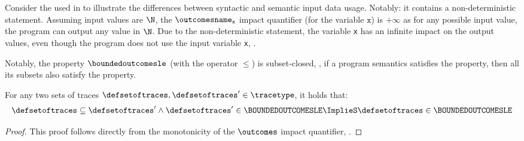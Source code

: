 \begin{example}
Consider the  used in  to illustrate the differences between syntactic and semantic input data usage. Notably: it contains a non-deterministic statement.
Assuming input values are $\N$, the $\outcomesname_{\texttt{x}}$ impact quantifier (for the variable $\texttt{x}$) is $+\infty$ as for any possible input value, the program can output any value in $\N$.
Due to the non-deterministic statement, the variable \texttt{x} has an infinite impact on the output values, even though the program does not use the input variable \texttt{x}, \cf{} .
\end{example}

Notably, the property $\boundedoutcomesle$ (with the operator $\le$) is subset-closed, \ie, if a program semantics satisfies the property, then all its subsets also satisfy the property.

\begin{lemma}
  For any two sets of traces $\defsetoftraces, \defsetoftraces'\in\tracetype$, it holds that:
  \begin{gather*}
    \defsetoftraces \subseteq \defsetoftraces' \land \defsetoftraces' \in \BOUNDEDOUTCOMESLE \ImplieS \defsetoftraces \in \BOUNDEDOUTCOMESLE
  \end{gather*}
\end{lemma}
\begin{proof}
  This proof follows directly from the monotonicity of the $\outcomes$ impact quantifier, \cf{} .
\end{proof}

